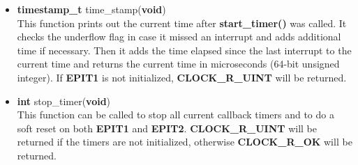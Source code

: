 \documentclass[12pt]{article}
\begin{document}
\begin{itemize}
\item \textbf{timestamp\_t} time\_stamp(\textbf{void})\\
This function prints out the current time after \textbf{start\_timer()} was called. It checks the underflow flag in case it missed an interrupt and adds additional time if necessary. Then it adds the time elapsed since the last interrupt to the current time and returns the current time in microseconds (64-bit unsigned integer). If \textbf{EPIT1} is not initialized, \textbf{CLOCK\_R\_UINT} will be returned.

\item \textbf{int} stop\_timer(\textbf{void})\\
This function can be called to stop all current callback timers and to do a soft reset on both \textbf{EPIT1} and \textbf{EPIT2}. \textbf{CLOCK\_R\_UINT} will be returned if the timers are not initialized, otherwise \textbf{CLOCK\_R\_OK} will be returned.
\end{itemize}
\end{document}
